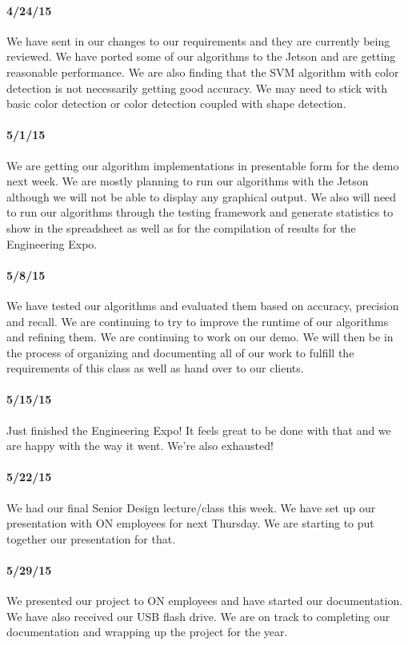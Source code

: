 \documentclass[letterpaper,10pt,titlepage]{article}
\begin{document}
    \paragraph*{4/24/15}
    We have sent in our changes to our requirements and they are currently 
    being reviewed. We have ported some of our algorithms to the Jetson and are
    getting reasonable performance. We are also finding that the SVM algorithm
    with color detection is not necessarily getting good accuracy. We may need
    to stick with basic color detection or color detection coupled with shape
    detection. 
    \paragraph*{5/1/15}
    We are getting our algorithm implementations in presentable form for the 
    demo next week. We are mostly planning to run our algorithms with the 
    Jetson although we will not be able to display any graphical output. We 
    also will need to run our algorithms through the testing framework and 
    generate statistics to show in the spreadsheet as well as for the 
    compilation of results for the Engineering Expo.
    \paragraph*{5/8/15}
    We have tested our algorithms and evaluated them based on accuracy, 
    precision and recall. We are continuing to try to improve the runtime of
    our algorithms and refining them. We are continuing to work on our demo.
    We will then be in the process of organizing and documenting all of our 
    work to fulfill the requirements of this class as well as hand over to our
    clients. 
    \paragraph*{5/15/15}
    Just finished the Engineering Expo! It feels great to be done with that 
    and we are happy with the way it went. We're also exhausted!
    \paragraph*{5/22/15}
    We had our final Senior Design lecture/class this week. We have set up our
    presentation with ON employees for next Thursday. We are starting to put 
    together our presentation for that. 
    \paragraph*{5/29/15}
    We presented our project to ON employees and have started our documentation.
    We have also received our USB flash drive. We are on track to completing
    our documentation and wrapping up the project for the year. 
\end{document}
